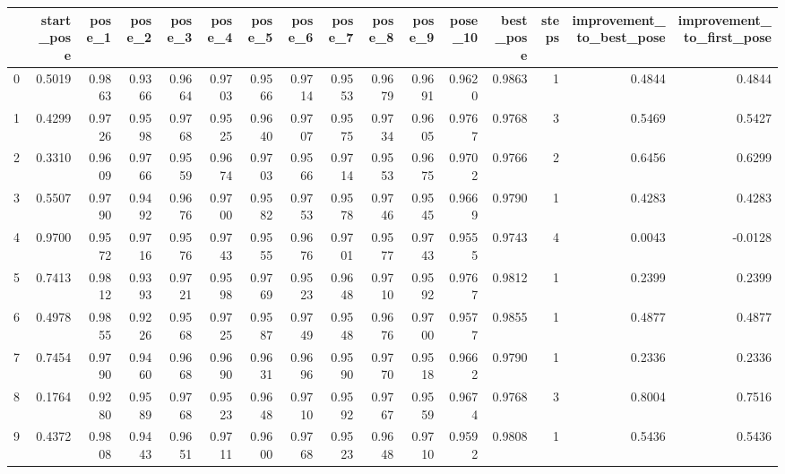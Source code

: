 \begin{tabular}{lrrrrrrrrrrrrrrr}
\toprule
{} &  start\_pose &  pose\_1 &  pose\_2 &  pose\_3 &  pose\_4 &  pose\_5 &  pose\_6 &  pose\_7 &  pose\_8 &  pose\_9 &  pose\_10 &  best\_pose &  steps &  improvement\_to\_best\_pose &  improvement\_to\_first\_pose \\
\midrule
0 &      0.5019 &  0.9863 &  0.9366 &  0.9664 &  0.9703 &  0.9566 &  0.9714 &  0.9553 &  0.9679 &  0.9691 &   0.9620 &     0.9863 &      1 &                    0.4844 &                     0.4844 \\
1 &      0.4299 &  0.9726 &  0.9598 &  0.9768 &  0.9525 &  0.9640 &  0.9707 &  0.9575 &  0.9734 &  0.9605 &   0.9767 &     0.9768 &      3 &                    0.5469 &                     0.5427 \\
2 &      0.3310 &  0.9609 &  0.9766 &  0.9559 &  0.9674 &  0.9703 &  0.9566 &  0.9714 &  0.9553 &  0.9675 &   0.9702 &     0.9766 &      2 &                    0.6456 &                     0.6299 \\
3 &      0.5507 &  0.9790 &  0.9492 &  0.9676 &  0.9700 &  0.9582 &  0.9753 &  0.9578 &  0.9746 &  0.9545 &   0.9669 &     0.9790 &      1 &                    0.4283 &                     0.4283 \\
4 &      0.9700 &  0.9572 &  0.9716 &  0.9576 &  0.9743 &  0.9555 &  0.9676 &  0.9701 &  0.9577 &  0.9743 &   0.9555 &     0.9743 &      4 &                    0.0043 &                    -0.0128 \\
5 &      0.7413 &  0.9812 &  0.9393 &  0.9721 &  0.9598 &  0.9769 &  0.9523 &  0.9648 &  0.9710 &  0.9592 &   0.9767 &     0.9812 &      1 &                    0.2399 &                     0.2399 \\
6 &      0.4978 &  0.9855 &  0.9226 &  0.9568 &  0.9725 &  0.9587 &  0.9749 &  0.9548 &  0.9676 &  0.9700 &   0.9577 &     0.9855 &      1 &                    0.4877 &                     0.4877 \\
7 &      0.7454 &  0.9790 &  0.9460 &  0.9668 &  0.9690 &  0.9631 &  0.9696 &  0.9590 &  0.9770 &  0.9518 &   0.9662 &     0.9790 &      1 &                    0.2336 &                     0.2336 \\
8 &      0.1764 &  0.9280 &  0.9589 &  0.9768 &  0.9523 &  0.9648 &  0.9710 &  0.9592 &  0.9767 &  0.9559 &   0.9674 &     0.9768 &      3 &                    0.8004 &                     0.7516 \\
9 &      0.4372 &  0.9808 &  0.9443 &  0.9651 &  0.9711 &  0.9600 &  0.9768 &  0.9523 &  0.9648 &  0.9710 &   0.9592 &     0.9808 &      1 &                    0.5436 &                     0.5436 \\
\bottomrule
\end{tabular}
